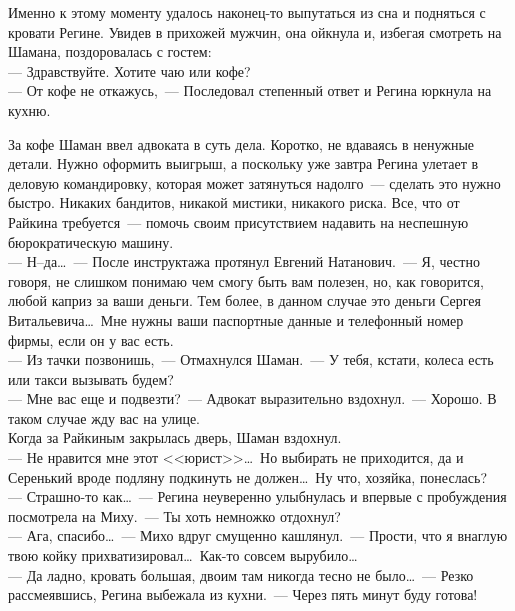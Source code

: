 Именно к этому моменту удалось наконец-то выпутаться из сна и подняться с 
кровати Регине. Увидев в прихожей мужчин, она ойкнула и, избегая смотреть на 
Шамана, поздоровалась с гостем:\\
--- Здравствуйте. Хотите чаю или кофе?\\
--- От кофе не откажусь,~--- Последовал степенный ответ и Регина юркнула на 
кухню. 

За кофе Шаман ввел адвоката в суть дела. Коротко, не вдаваясь в ненужные 
детали. Нужно оформить выигрыш, а поскольку уже завтра Регина улетает в деловую 
командировку, которая может затянуться надолго~--- сделать это нужно быстро. 
Никаких бандитов, никакой мистики, никакого риска. Все, что от Райкина 
требуется~--- помочь своим присутствием надавить на неспешную бюрократическую машину.\\
--- Н--да\ldots~--- После инструктажа протянул Евгений Натанович.~--- Я, честно 
говоря, не слишком понимаю чем смогу быть вам полезен, но, как говорится, любой каприз за 
ваши деньги. Тем более, в данном случае это деньги Сергея Витальевича\ldots\ 
Мне нужны ваши паспортные данные и телефонный номер фирмы, если он у вас есть.\\
--- Из тачки позвонишь,~--- Отмахнулся Шаман.~--- У тебя, кстати, колеса есть или 
такси вызывать будем?\\
--- Мне вас еще и подвезти?~--- Адвокат выразительно вздохнул.~--- Хорошо. В 
таком случае жду вас на улице.\\
Когда за Райкиным закрылась дверь, Шаман вздохнул.\\
--- Не нравится мне этот <<юрист>>\ldots\ Но выбирать не приходится, да и 
Серенький вроде подляну подкинуть не должен\ldots\ Ну что, хозяйка, понеслась?\\
--- Страшно-то как\ldots~--- Регина неуверенно улыбнулась и впервые с пробуждения 
посмотрела на Миху.~--- Ты хоть немножко отдохнул?\\
--- Ага, спасибо\ldots~--- Михо вдруг смущенно кашлянул.~--- Прости, что я 
внаглую твою койку прихватизировал\ldots\ Как-то совсем вырубило\ldots\\
--- Да ладно, кровать большая, двоим там никогда тесно не было\ldots~--- Резко 
рассмеявшись, Регина выбежала из кухни.~--- Через пять минут буду готова!

